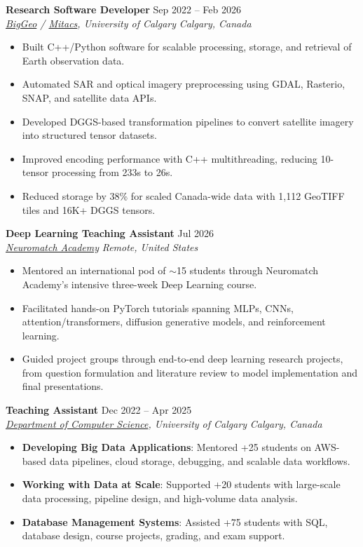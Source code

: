 \documentclass[a4paper,10pt]{article}
\newcommand{\resumeSubheading}[4]{
    \textbf{#1} \hfill #2 \\
    \textit{#3} \hfill \textit{#4}
}
\begin{document}
\resumeSubheading
{Research Software Developer}
{Sep 2022 -- Feb 2026}
{\href{https://biggeo.com}{BigGeo} / \href{https://www.mitacs.ca/}{Mitacs}, University of Calgary}
{Calgary, Canada}
\begin{itemize}[leftmargin=0.25in]
    \item Built C++/Python software for scalable processing, storage, and retrieval of Earth observation data.
    \item Automated SAR and optical imagery preprocessing using GDAL, Rasterio, SNAP, and satellite data APIs.
    \item Developed DGGS-based transformation pipelines to convert satellite imagery into structured tensor datasets.
    \item Improved encoding performance with C++ multithreading, reducing 10-tensor processing from 233s to 26s.
    \item Reduced storage by 38\% for scaled Canada-wide data with 1,112 GeoTIFF tiles and 16K+ DGGS tensors.
\end{itemize}

\resumeSubheading
{Deep Learning Teaching Assistant}
{Jul 2026}
{\href{https://neuromatch.io/}{Neuromatch Academy}}
{Remote, United States}
\begin{itemize}[leftmargin=0.25in]
    \item Mentored an international pod of $\sim$15 students through Neuromatch Academy's intensive three-week Deep Learning course.
    \item Facilitated hands-on PyTorch tutorials spanning MLPs, CNNs, attention/transformers, diffusion generative models, and reinforcement learning.
    \item Guided project groups through end-to-end deep learning research projects, from question formulation and literature review to model implementation and final presentations.
\end{itemize}

\resumeSubheading
{Teaching Assistant}
{Dec 2022 -- Apr 2025}
{\href{https://science.ucalgary.ca/computer-science} {Department of Computer Science}, University of Calgary}
{Calgary, Canada}
\begin{itemize}[leftmargin=0.25in]
    \item \textbf{Developing Big Data Applications}: Mentored +25 students on AWS-based data pipelines, cloud storage, debugging, and scalable data workflows.
    \item \textbf{Working with Data at Scale}: Supported +20 students with large-scale data processing, pipeline design, and high-volume data analysis.
    \item \textbf{Database Management Systems}: Assisted +75 students with SQL, database design, course projects, grading, and exam support.
\end{itemize}
\end{document}
